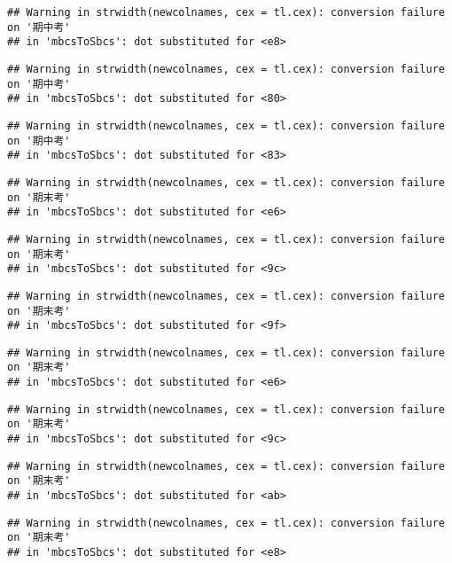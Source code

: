 \documentclass[
]{book}
\begin{document}
\begin{verbatim}
## Warning in strwidth(newcolnames, cex = tl.cex): conversion failure on '期中考'
## in 'mbcsToSbcs': dot substituted for <e8>
\end{verbatim}

\begin{verbatim}
## Warning in strwidth(newcolnames, cex = tl.cex): conversion failure on '期中考'
## in 'mbcsToSbcs': dot substituted for <80>
\end{verbatim}

\begin{verbatim}
## Warning in strwidth(newcolnames, cex = tl.cex): conversion failure on '期中考'
## in 'mbcsToSbcs': dot substituted for <83>
\end{verbatim}

\begin{verbatim}
## Warning in strwidth(newcolnames, cex = tl.cex): conversion failure on '期末考'
## in 'mbcsToSbcs': dot substituted for <e6>
\end{verbatim}

\begin{verbatim}
## Warning in strwidth(newcolnames, cex = tl.cex): conversion failure on '期末考'
## in 'mbcsToSbcs': dot substituted for <9c>
\end{verbatim}

\begin{verbatim}
## Warning in strwidth(newcolnames, cex = tl.cex): conversion failure on '期末考'
## in 'mbcsToSbcs': dot substituted for <9f>
\end{verbatim}

\begin{verbatim}
## Warning in strwidth(newcolnames, cex = tl.cex): conversion failure on '期末考'
## in 'mbcsToSbcs': dot substituted for <e6>
\end{verbatim}

\begin{verbatim}
## Warning in strwidth(newcolnames, cex = tl.cex): conversion failure on '期末考'
## in 'mbcsToSbcs': dot substituted for <9c>
\end{verbatim}

\begin{verbatim}
## Warning in strwidth(newcolnames, cex = tl.cex): conversion failure on '期末考'
## in 'mbcsToSbcs': dot substituted for <ab>
\end{verbatim}

\begin{verbatim}
## Warning in strwidth(newcolnames, cex = tl.cex): conversion failure on '期末考'
## in 'mbcsToSbcs': dot substituted for <e8>
\end{verbatim}
\end{document}
